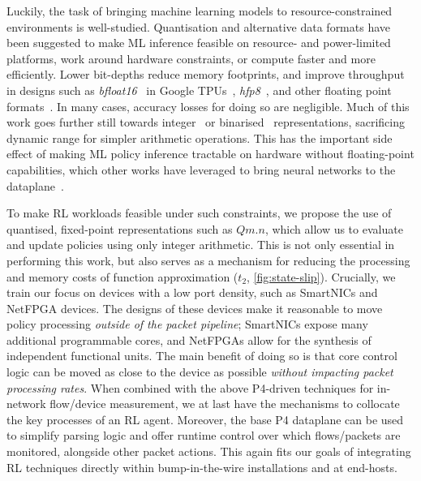 \documentclass[sigconf,natbib=false]{acmart}
\begin{document}
Luckily, the task of bringing machine learning models to resource-constrained environments is well-studied.
Quantisation and alternative data formats have been suggested to make ML inference feasible on resource- and power-limited platforms, work around hardware constraints, or compute faster and more efficiently.
Lower bit-depths reduce memory footprints, and improve throughput in designs such as \emph{bfloat16}~\parencite{bfloat16-blog} in Google TPUs~\parencite{DBLP:journals/sigops/XieDMKVZT18}, \emph{hfp8}~\parencite{DBLP:conf/nips/SunCCWVSCZG19}, and other floating point formats~\parencite{DBLP:journals/corr/abs-2007-01530}.
In many cases, accuracy losses for doing so are negligible.
Much of this work goes further still towards integer~\parencite{tensorrt-8bit} or binarised~\parencite{DBLP:journals/corr/MiyashitaLM16,DBLP:conf/eccv/RastegariORF16,DBLP:journals/corr/KimS16,DBLP:conf/nips/HubaraCSEB16} representations, sacrificing dynamic range for simpler arithmetic operations.
This has the important side effect of making ML policy inference tractable on hardware without floating-point capabilities, which other works have leveraged to bring neural networks to the dataplane~\parencite{DBLP:journals/corr/abs-2009-02353,DBLP:conf/sigcomm/SanvitoSB18,DBLP:journals/corr/abs-1801-05731}.

To make RL workloads feasible under such constraints, we propose the use of quantised, fixed-point representations such as $Qm.n$, which allow us to evaluate and update policies using only integer arithmetic.
This is not only essential in performing this work, but also serves as a mechanism for reducing the processing and memory costs of function approximation ($t_2$, \cref{fig:state-slip}).
Crucially, we train our focus on devices with a low port density, such as SmartNICs and NetFPGA devices.
The designs of these devices make it reasonable to move policy processing \emph{outside of the packet pipeline}; SmartNICs expose many additional programmable cores, and NetFPGAs allow for the synthesis of independent functional units.
The main benefit of doing so is that core control logic can be moved as close to the device as possible \emph{without impacting packet processing rates}.
When combined with the above P4-driven techniques for in-network flow/device measurement, we at last have the mechanisms to collocate the key processes of an RL agent.
Moreover, the base P4 dataplane can be used to simplify parsing logic and offer runtime control over which flows/packets are monitored, alongside other packet actions.
This again fits our goals of integrating RL techniques directly within bump-in-the-wire installations and at end-hosts.
\end{document}
